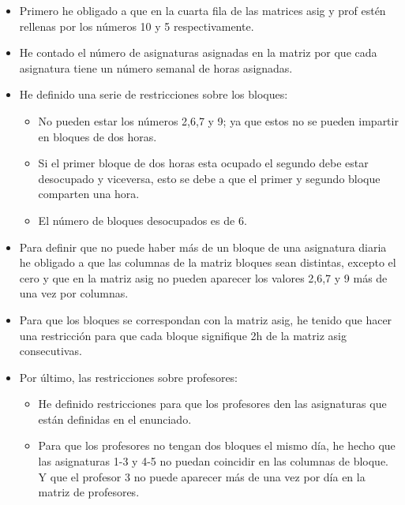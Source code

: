 \documentclass[a4paper,11pt]{article}
\begin{document}
\begin{itemize}

\item Primero he obligado a que en la cuarta fila de las matrices asig y prof estén rellenas por los números 10 y 5 respectivamente.

\item He contado el número de asignaturas asignadas en la matriz por que cada asignatura tiene un número semanal de horas asignadas.

\item He definido una serie de restricciones sobre los bloques:
\begin{itemize}
\item No pueden estar los números 2,6,7 y 9; ya que estos no se pueden impartir en bloques de dos horas.
\item Si el primer bloque de dos horas esta ocupado el segundo debe estar desocupado y viceversa, esto se debe a que el primer y segundo bloque comparten una hora.
\item El número de bloques desocupados es de 6.
\end{itemize}

\item Para definir que no puede haber más de un bloque de una asignatura diaria he obligado a que las columnas de la matriz bloques sean distintas, excepto el cero y que en la matriz asig no pueden aparecer los valores 2,6,7 y 9 más de una vez por columnas.

\item Para que los bloques se correspondan con la matriz asig, he tenido que hacer una restricción para que cada bloque signifique 2h de la matriz asig consecutivas.

\item Por último, las restricciones sobre profesores:
\begin{itemize}
\item He definido restricciones para que los profesores den las asignaturas que están definidas en el enunciado.
\item Para que los profesores no tengan dos bloques el mismo día, he hecho que las asignaturas 1-3 y 4-5 no puedan coincidir en las columnas de bloque. Y que el profesor 3 no puede aparecer más de una vez por día en la matriz de profesores.
\end{itemize}

\end{itemize}
\end{document}

